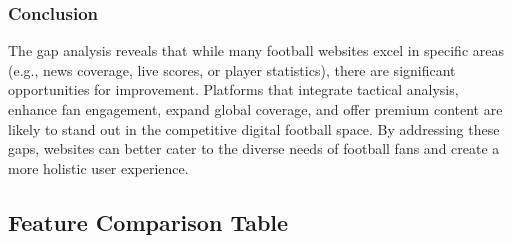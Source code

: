 \subsubsection{Conclusion}
The gap analysis reveals that while many football websites excel in specific areas (e.g., news coverage, live scores, or player statistics), there are significant opportunities for improvement. Platforms that integrate tactical analysis, enhance fan engagement, expand global coverage, and offer premium content are likely to stand out in the competitive digital football space. By addressing these gaps, websites can better cater to the diverse needs of football fans and create a more holistic user experience.

\subsection{Feature Comparison Table}


